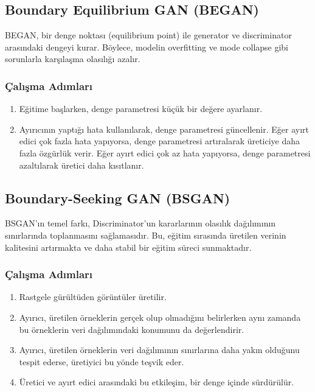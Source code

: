 \newpage

\subsection{Boundary Equilibrium GAN (BEGAN)}

BEGAN, bir denge noktası (equilibrium point) ile generator ve discriminator arasındaki dengeyi kurar. Böylece, modelin overfitting ve mode collapse gibi sorunlarla karşılaşma olasılığı azalır. 

\subsubsection{Çalışma Adımları}

\begin{enumerate}
    \item Eğitime başlarken, denge parametresi küçük bir değere ayarlanır. 
    \item Ayırıcının yaptığı hata kullanılarak, denge parametresi güncellenir. Eğer ayırt edici çok fazla hata yapıyorsa, denge parametresi artıralarak üreticiye daha fazla özgürlük verir. Eğer ayırt edici çok az hata yapıyorsa, denge parametresi azaltılarak üretici daha kısıtlanır.
\end{enumerate}

\newpage

\subsection{Boundary-Seeking GAN (BSGAN)}

BSGAN'ın temel farkı, Discriminator'un kararlarının olasılık dağılımının sınırlarında toplanmasını sağlamasıdır. Bu, eğitim sırasında üretilen verinin kalitesini artırmakta ve daha stabil bir eğitim süreci sunmaktadır.

\subsubsection{Çalışma Adımları}

\begin{enumerate}
    \item Rastgele gürültüden görüntüler üretilir.
    \item Ayırıcı, üretilen örneklerin gerçek olup olmadığını belirlerken aynı zamanda bu örneklerin veri dağılımındaki konumunu da değerlendirir.
    \item Ayırıcı, üretilen örneklerin veri dağılımının sınırlarına daha yakın olduğunu tespit ederse, üretiyici bu yönde teşvik eder.
    \item Üretici ve ayırt edici arasındaki bu etkileşim, bir denge içinde sürdürülür.
\end{enumerate}

